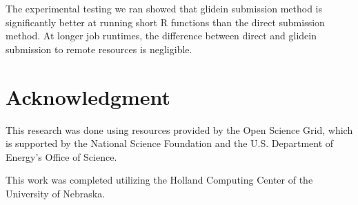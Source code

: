 \documentclass[conference]{IEEEtran}
\begin{document}
The experimental testing we ran showed that glidein submission method is significantly better at running short R functions than the direct submission method.  At longer job runtimes, the difference between direct and glidein submission to remote resources is negligible.








\section*{Acknowledgment}
This research was done using resources provided by the Open Science Grid, which is supported by the National Science Foundation and the U.S. Department of Energy's Office of Science.

This work was completed utilizing the Holland Computing Center of the University of Nebraska.

\newpage




%
%
%





\end{document}
